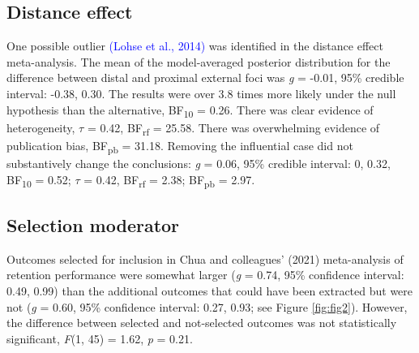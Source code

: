 \documentclass[
  man, donotrepeattitle,floatsintext]{apa7}
\begin{document}
\hypertarget{distance-effect}{%
\subsection{Distance effect}\label{distance-effect}}

One possible outlier \textcolor{blue}{(Lohse et al., 2014)} was identified in the distance effect meta-analysis. The mean of the model-averaged posterior distribution for the difference between distal and proximal external foci was \emph{g} = -0.01, 95\% credible interval: -0.38, 0.30. The results were over 3.8 times more likely under the null hypothesis than the alternative, BF\textsubscript{10} = 0.26. There was clear evidence of heterogeneity, \(\tau\) = 0.42, BF\textsubscript{rf} = 25.58. There was overwhelming evidence of publication bias, BF\textsubscript{pb} = 31.18. Removing the influential case did not substantively change the conclusions: \emph{g} = 0.06, 95\% credible interval: 0, 0.32, BF\textsubscript{10} = 0.52; \(\tau\) = 0.42, BF\textsubscript{rf} = 2.38; BF\textsubscript{pb} = 2.97.

\hypertarget{selection-moderator}{%
\subsection{Selection moderator}\label{selection-moderator}}

Outcomes selected for inclusion in Chua and colleagues' (2021) meta-analysis of retention performance were somewhat larger (\emph{g} = 0.74, 95\% confidence interval: 0.49, 0.99) than the additional outcomes that could have been extracted but were not (\emph{g} = 0.60, 95\% confidence interval: 0.27, 0.93; see Figure \ref{fig:fig2}). However, the difference between selected and not-selected outcomes was not statistically significant, \emph{F}(1, 45) = 1.62, \emph{p} = 0.21.

\clearpage
\vspace{-3em}
\end{document}

